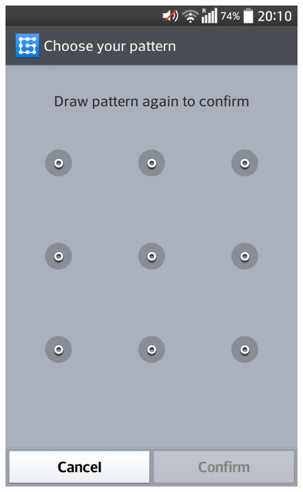\begin{figure}[H]
{        \includegraphics[scale=0.09]{pics/experiment/patternprocess5.png}
        \label{fig:redrawpattern}
      }
\end{figure}
